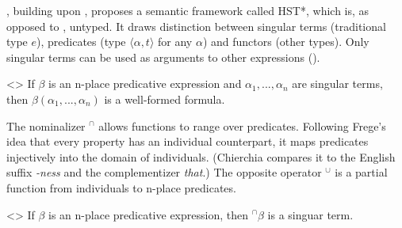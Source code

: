 \documentclass[a4paper, 12pt]{article}
\begin{document}
\textcite{chierchia1984topicssyntaxsemantics}, building upon \textcite{cocchiarella1974fregeansemanticsrealist}, proposes a semantic framework called HST*, which is, as opposed to \textcite{montague1973propertreatmentquantification}, untyped. It draws distinction between singular terms (traditional type $e$), predicates (type $\langle \alpha,t\rangle$ for any $\alpha$) and functors (other types).  Only singular terms can be used as arguments to other expressions (\nextx).

\ex<>
    If $\beta$ is an n-place predicative expression and $\alpha_1,...,\alpha_n$ are singular terms, then $\beta(\alpha_1,...,\alpha_n)$ is a well-formed formula.
\xe

The nominalizer $^\cap$ allows functions to range over predicates. Following Frege's idea that every property has an individual counterpart, it maps predicates injectively into the domain of individuals. (Chierchia compares it to the English suffix \textit{-ness} and the complementizer \textit{that}.) The opposite operator $^\cup $ is a partial function from individuals to n-place predicates.\footnotemark{}

\ex<>
    If $\beta$ is an n-place predicative expression, then $^\cap\beta$ is a singuar term.
\xe

\end{document}
